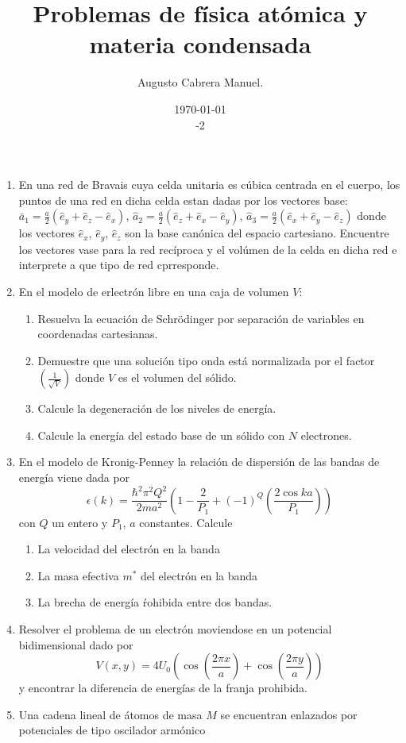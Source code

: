 \documentclass[]{article}
\title{Problemas de física atómica y materia condensada}
\author{Augusto Cabrera Manuel.}
\date{\today\\ \ser 8 \sem 2018-2 }
\begin{document}
\maketitle
\begin{enumerate}
\item En una red de Bravais cuya celda unitaria es cúbica centrada en el cuerpo, los puntos de una red en dicha celda estan dadas por los vectores base: $\bar{a}_1=\frac{a}{2}(\hat{e}_y+\hat{e}_z-\hat{e}_x)$, $\hat{a}_2=\frac{a}{2}(\hat{e}_z+\hat{e}_x-\hat{e}_y)$, $\hat{a}_3=\frac{a}{2}(\hat{e}_x+\hat{e}_y-\hat{e}_z)$ donde los vectores $\hat{e}_x$, $\hat{e}_y$, $\hat{e}_z$ son la base canónica del espacio cartesiano. Encuentre los vectores vase para la red recíproca y el volúmen de la celda en dicha red e interprete a que tipo de red cprresponde.
\item En el modelo de erlectrón libre en una caja de volumen $V$:
  \begin{enumerate}
  \item Resuelva la ecuación de Schrödinger por separación de variables  en coordenadas cartesianas.
  \item Demuestre que una solución tipo onda está normalizada por el factor $\left(\frac{1}{\sqrt{V}}\right)$ donde $V$ es el volumen del sólido.
  \item Calcule la degeneración de los niveles de energía.
  \item Calcule la energía del estado base de un sólido con $N$ electrones.
  \end{enumerate}
\item En el modelo de Kronig-Penney la relación de dispersión de las bandas de energía viene dada por
$$\epsilon(k)=\frac{\hbar^2\pi^2Q^2}{2ma^2}\left(1-\frac{2}{P_1}+\left(-1\right)^Q\left(\frac{2\cos ka}{P_1}\right)\right)
$$
con $Q$ un entero y $P_1$, $a$ constantes. Calcule
\begin{enumerate}
\item La velocidad del electrón en la banda
\item La masa efectiva $m^*$ del electrón en la banda
\item La brecha de energía ŕohibida entre dos bandas.
\end{enumerate}
\item  Resolver el problema de un electrón moviendose en un potencial bidimensional dado por
$$V(x,y)=4U_0\left(\cos\left(\frac{2\pi x}{a}\right)+\cos\left(\frac{2\pi y}{a}\right)\right)
$$
y encontrar la diferencia de energías de la franja prohibida.
\item Una cadena lineal de átomos de masa $M$ se encuentran enlazados por potenciales de tipo oscilador armónico

\end{enumerate}
\end{document}
